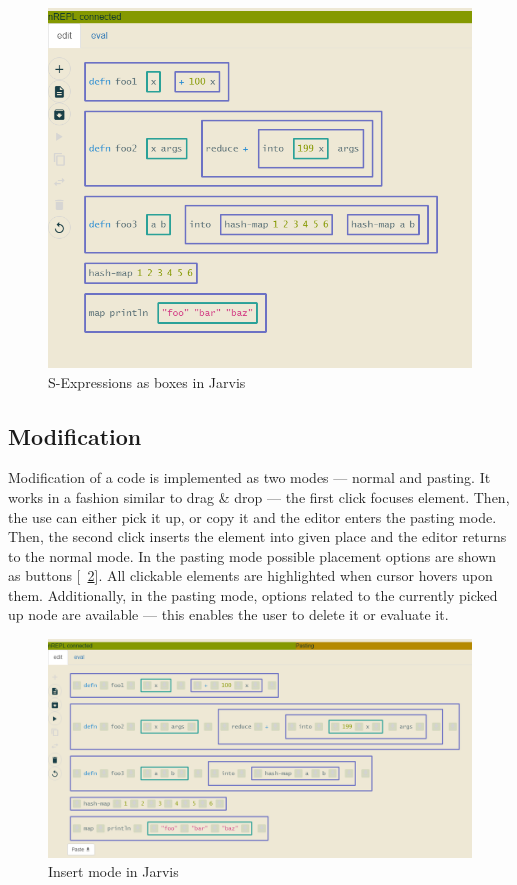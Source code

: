 \documentclass[11pt]{scrartcl}
\newcommand*{\figref}[1]{[\textbf{\figurename}~\ref{#1}]}
\begin{document}
\begin{figure}[hbt]
  \centering
  \includegraphics[scale=0.3]{img/j-boxes_f}
  \caption{S-Expressions as boxes in Jarvis}
\label{fig:j-box}
\end{figure}

\subsection{Modification}
Modification of a code is implemented as two modes --- normal and pasting.
It works in a fashion similar to drag \& drop --- the first click focuses element.
Then, the use can either pick it up, or copy it and the editor enters the
pasting mode.
Then, the second click inserts the element into given place and the editor
returns to the normal mode.
In the pasting mode possible placement options are shown as buttons
\figref{fig:j-insert}.
All clickable elements are highlighted when cursor hovers upon them.
Additionally, in the pasting mode, options related to the currently picked up
node are available --- this enables the user to delete it or evaluate it.


\begin{figure}[hbt]
  \centering
  \includegraphics[scale=0.3]{img/j-insert_f}
  \caption{Insert mode in Jarvis}
\label{fig:j-insert}
\end{figure}
\end{document}
